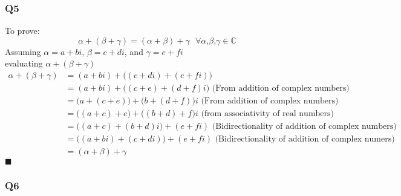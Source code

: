 \documentclass{article}
\begin{document}
\subsubsection*{Q5}
To prove:
\begin{equation*}
    \alpha + \left( \beta + \gamma \right) = \left( \alpha + \beta \right) + \gamma \textrm{ }\forall \alpha \textrm{,} \beta \textrm{,} \gamma \in \mathbb{C}
\end{equation*}
Assuming $\alpha = a + bi$, $\beta = c + di$, and $\gamma = e + fi$ \\
evaluating $\alpha + \left( \beta + \gamma \right)$
\begin{equation*}
    \begin{split}
        \alpha + \left( \beta + \gamma \right) &= (a + bi) + \Big( (c + di ) + (e + fi) \Big) \\
                                               &= (a + bi) + \Big( (c + e) + (d + f)i \Big)  \textrm{ (From addition of complex numbers)}\\
                                               &=  \Big(a + ( c + e) \Big) + \Big( b + ( d + f) \Big) i\textrm{ (From addition of complex numbers)} \\
                                               &= \Big( (a + c) + e \Big) + \Big( (b + d) + f \Big) i\textrm{  (from associativity of real numbers)} \\
                                               &= \Big( (a + c) + (b +d )i \Big) + (e + fi) \textrm{ (Bidirectionality of addition of complex numbers)} \\
                                               &= \Big( (a+ bi) + (c + di) \Big) + (e + fi) \textrm{ (Bidirectionality of addition of complex numers)} \\
                                               &= (\alpha + \beta) + \gamma
    \end{split}
\end{equation*}
$\blacksquare$

\subsubsection*{Q6}
\end{document}

